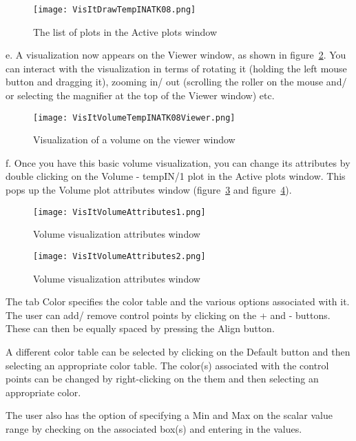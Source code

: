 \begin{figure}
  \center
  \texttt{[image: VisItDrawTempINATK08.png]}
  \caption{The list of plots in the Active plots window}
  \label{VisItDrawTempINATK08}
\end{figure}

e. A visualization now appears on the Viewer window, as shown in figure~\ref{VisItVolumeTempINATK08Viewer}. You can interact with the visualization in terms of rotating it (holding the left mouse button and dragging it), zooming in/ out (scrolling the roller on the mouse and/ or selecting the magnifier at the top of the Viewer window) etc.

\begin{figure}
  \center
  \texttt{[image: VisItVolumeTempINATK08Viewer.png]}
  \caption{Visualization of a volume on the viewer window}
  \label{VisItVolumeTempINATK08Viewer}
\end{figure}

f. Once you have this basic volume visualization, you can change its attributes by double clicking on the Volume - tempIN/1 plot in the Active plots window. This pops up the Volume plot attributes window (figure~\ref{VisItVolumeAttributes1} and figure~\ref{VisItVolumeAttributes2}).

\begin{figure}
  \center
  \texttt{[image: VisItVolumeAttributes1.png]}
  \caption{Volume visualization attributes window}
  \label{VisItVolumeAttributes1}
\end{figure}

\begin{figure}
  \center
  \texttt{[image: VisItVolumeAttributes2.png]}
  \caption{Volume visualization attributes window}
  \label{VisItVolumeAttributes2}
\end{figure}

The tab Color specifies the color table and the various options associated with it. The user can add/ remove control points by clicking on the + and - buttons. These can then be equally spaced by pressing the Align button.

A different color table can be selected by clicking on the Default button and then selecting an appropriate color table. The color(s) associated with the control points can be changed by right-clicking on the them and then selecting an appropriate color.

The user also has the option of specifying a Min and Max on the scalar value range by checking on the associated box(s) and entering in the values.

